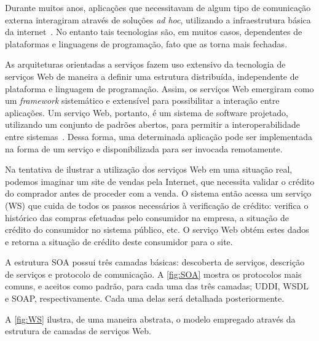 \documentclass[12pt]{report} %
\begin{document}
	    Durante muitos anos, aplicações que necessitavam de algum tipo de comunicação externa interagiram através de soluções \textit{ad hoc}, utilizando a infraestrutura básica da internet~\cite{IntroWS}.
	    No entanto tais tecnologias são, em muitos casos, dependentes de plataformas e linguagens de programação, fato que as torna mais fechadas.
	    
	    As arquiteturas orientadas a serviços fazem uso extensivo da tecnologia de serviços Web de maneira a definir uma estrutura distribuída, independente de plataforma e linguagem de programação.
	    Assim, os serviços Web emergiram como um \textit{framework} sistemático e extensível para possibilitar a interação entre aplicações.
	    Um serviço Web, portanto, é um sistema de software projetado, utilizando um conjunto de padrões abertos, para permitir a interoperabilidade entre sistemas~\cite{alonso2004}.
	    Dessa forma, uma determinada aplicação pode ser implementada na forma de um serviço e disponibilizada para ser invocada remotamente.            

	    Na tentativa de ilustrar a utilização dos serviços Web em uma situação real, podemos imaginar um site de vendas pela Internet, que necessita validar o crédito do comprador antes de proceder com a venda.
	    O sistema então acessa um serviço (WS) que cuida de todos os passos necessários à verificação de crédito: verifica o histórico das compras efetuadas pelo consumidor na empresa, a situação de crédito do consumidor no sistema público, etc.
	    O serviço Web obtém estes dados e retorna a situação de crédito deste consumidor para o site.

		    
	    A estrutura SOA possui três camadas básicas: descoberta de serviços, descrição de serviços e protocolo de comunicação.
	    A \autoref{fig:SOA} mostra os protocolos mais comuns, e aceitos como padrão, para cada uma das três camadas; UDDI, WSDL e SOAP, respectivamente.
	    Cada uma delas será detalhada posteriormente.

	    A \autoref{fig:WS} ilustra, de uma maneira abstrata, o modelo empregado através da estrutura de camadas de serviços Web.
	    
\end{document}
